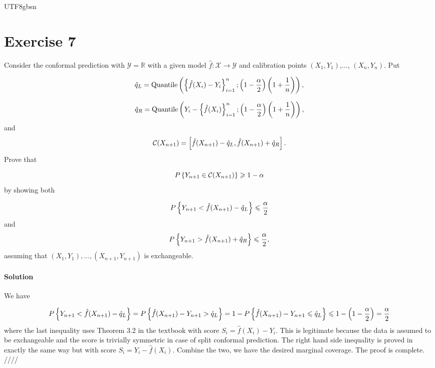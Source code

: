 \documentclass[../main.tex]{subfiles}
\begin{document}
\begin{CJK*}{UTF8}{gbsn}

\section*{Exercise 7}
Consider the conformal prediction with $\mathcal{Y} = \mathbb{R}$
with a given model $\hat{f}: \mathcal{X} \to \mathcal{Y}$
and calibration points $(X_1, Y_1)$,$\ldots$, $(X_n, Y_n)$.
Put 

\begin{equation*}
    \hat{q}_L = \text{Quantile}\bracket{\curly{\hat{f}(X_i)-Y_i}_{i=1}^n ; 
    \bracket{1- \frac{\alpha}{2}} \bracket{1+ \frac{1}{n}}},
\end{equation*}

\begin{equation*}
    \hat{q}_R = \text{Quantile}\bracket{Y_i-\curly{\hat{f}(X_i)}_{i=1}^n ; 
    \bracket{1- \frac{\alpha}{2}} \bracket{1+ \frac{1}{n}}},
\end{equation*}
and
\begin{equation*}
    \mathcal{C}(X_{n+1}) = \squared{\hat{f}(X_{n+1}) - \hat{q}_L, \hat{f}(X_{n+1}) + \hat{q}_R}.
\end{equation*}
Prove that 

\begin{equation*}
    P \curly{Y_{n+1} \in \mathcal{C}(X_{n+1})} \geqslant 1-\alpha
\end{equation*}
by showing both

\begin{equation*}
    P \curly{Y_{n+1} < \hat{f}(X_{n+1}) - \hat{q}_L} \leqslant \frac{\alpha}{2}
\end{equation*}
and 
\begin{equation*}
    P \curly{Y_{n+1} > \hat{f}(X_{n+1}) + \hat{q}_R} \leqslant \frac{\alpha}{2},
\end{equation*}
assuming that $(X_1, Y_1),\ldots, (X_{n+1}, Y_{n+1})$
is exchangeable.

\paragraph{Solution}
We have

\begin{equation*}
    P \curly{Y_{n+1} < \hat{f}(X_{n+1}) - \hat{q}_L}
    = P \curly{\hat{f}(X_{n+1}) - Y_{n+1} > \hat{q}_L }
    = 1 - P \curly{\hat{f}(X_{n+1}) - Y_{n+1} \leqslant \hat{q}_L }
    \leqslant 1 - \bracket{1- \frac{\alpha}{2}} = \frac{\alpha}{2}
\end{equation*}
where the last inequality 
uses Theorem 3.2 in the textbook
with score $S_i = \hat{f}(X_{i}) - Y_{i}$.
This is legitimate because the data is assumed 
to be exchangeable and the score is trivially 
symmetric in case of split conformal prediction.
The right hand side inequality is proved in 
exactly the same way but with score $S_i = Y_i-\hat{f}(X_{i})$.
Combine the two, we have the desired marginal coverage.
The proof is complete.
////
\end{CJK*}
\end{document}
